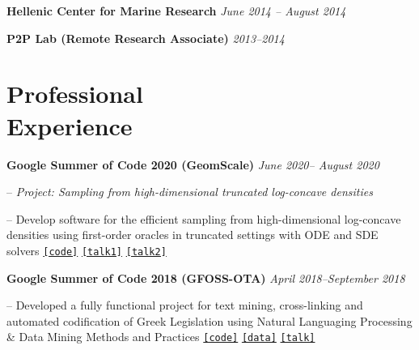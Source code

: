 \documentclass[margin]{res}
\newcommand{\field}[2]{\noindent \textbf{#1} \hfill #2 \\}
\newcommand{\specialurl}[2]{\href {#2} {\texttt{[#1]}}}
\newcommand{\code}[1]{\specialurl {code} {#1}}
\newcommand{\data}[1]{\specialurl {data} {#1}}
\newcommand{\talk}[1]{\specialurl {talk} {#1}}
\begin{document}
\begin{resume}
\textbf{Hellenic Center for Marine Research} \hfill \emph{June 2014 -- August 2014}



\textbf{P2P Lab (Remote Research Associate)} \hfill \emph{2013--2014}


 
\section{Professional \\ Experience}
\field{Google Summer of Code 2020 (GeomScale)}  {\emph{June 2020-- August 2020}}
\begin{compactitem}
\item[--] \emph{Project: Sampling from high-dimensional truncated log-concave densities} 
\item[--] Develop software for the efficient sampling from high-dimensional log-concave densities using first-order oracles in truncated settings with ODE and SDE solvers \code{https://GeomScale/volesti} \specialurl{talk1}{https://www.youtube.com/watch?v=P7YfC8Nn6sY} \specialurl{talk2}{https://www.cs.utah.edu/~jeffp/WaGoML/index.html}
\end{compactitem}

\field{Google Summer of Code 2018 (GFOSS-OTA)}  {\emph{April 2018--September 2018}}
\begin{compactitem}
\item[--] Developed a fully functional project for text mining, cross-linking and automated codification of Greek Legislation using Natural Languaging Processing \& Data Mining Methods and Practices \code{https://github.com/eellak/gsoc2018-3gm} \data{https://archive.org/details/greekgovernmentgazette} \talk{https://www.youtube.com/watch?v=_UIGsy85Ehw}


\end{compactitem}
\end{resume}
\end{document}
